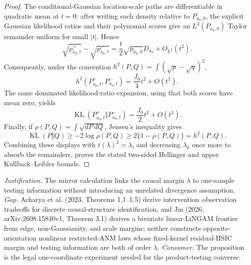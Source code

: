 \documentclass{article}
\begin{document}
\begin{proof}
The conditional-Gaussian location-scale paths are differentiable in quadratic mean at \(t=0\): after writing each density relative to \(P_{a_0,0}\), the explicit Gaussian likelihood ratios and their polynomial scores give an \(L^2(P_{a_0,0})\) Taylor remainder uniform for small \(|t|\).  Hence
\[
\sqrt{p^+_{a_0,t}}-\sqrt{p^-_{a_0,t}}
=\frac t2\sqrt{p_{a_0,0}}D_{a_0}+O_{L^2}(t^2).
\]
Consequently, under the convention \(h^2(P,Q)=\int(\sqrt p-\sqrt q)^2\),
\[
h^2(P^+_{a_0,t},P^-_{a_0,t})=\frac{J_0}{4}t^2+O(t^3).
\]
The same dominated likelihood-ratio expansion, using that both scores have mean zero, yields
\[
\operatorname{KL}(P^+_{a_0,t}\Vert P^-_{a_0,t})=\frac{J_0}{2}t^2+O(t^3).
\]
Finally, if \(\rho(P,Q)=\int\sqrt{dP\,dQ}\), Jensen's inequality gives
\[
\operatorname{KL}(P\Vert Q)\ge-2\log\rho(P,Q)\ge2\{1-\rho(P,Q)\}=h^2(P,Q).
\]
Combining these displays with \(t(\lambda)^2\asymp\lambda\), and decreasing \(\lambda_0\) once more to absorb the remainders, proves the stated two-sided Hellinger and upper Kullback--Leibler bounds.
\end{proof}
\par\smallskip\noindent \textit{Justification.} The mirror calculation links the causal margin \(\lambda\) to one-sample testing information without introducing an unrelated divergence assumption. \textit{Gap.} Acharya et al. (2023, Theorems 1.1--1.5) derive intervention--observation tradeoffs for discrete causal-structure identification, and Jin (2026, arXiv:2608.15840v1, Theorem 3.1) derives a bivariate linear-LiNGAM frontier from edge, non-Gaussianity, and scale margins; neither constructs opposite-orientation nonlinear restricted-ANM laws whose fixed-kernel residual-HSIC margin and testing information are both of order \(\lambda\). \textit{Consumer.} The proposition is the legal one-coordinate experiment needed for the product-testing converse.
\end{document}
